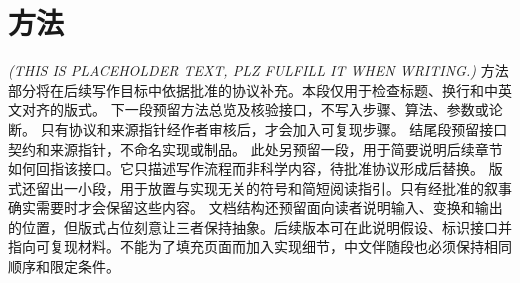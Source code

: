 \section{方法}\label{sec:approach}
\textit{(THIS IS PLACEHOLDER TEXT, PLZ FULFILL IT WHEN WRITING.)}
方法部分将在后续写作目标中依据批准的协议补充。本段仅用于检查标题、换行和中英文对齐的版式。
下一段预留方法总览及核验接口，不写入步骤、算法、参数或论断。
只有协议和来源指针经作者审核后，才会加入可复现步骤。
结尾段预留接口契约和来源指针，不命名实现或制品。
此处另预留一段，用于简要说明后续章节如何回指该接口。它只描述写作流程而非科学内容，待批准协议形成后替换。
版式还留出一小段，用于放置与实现无关的符号和简短阅读指引。只有经批准的叙事确实需要时才会保留这些内容。
文档结构还预留面向读者说明输入、变换和输出的位置，但版式占位刻意让三者保持抽象。后续版本可在此说明假设、标识接口并指向可复现材料。不能为了填充页面而加入实现细节，中文伴随段也必须保持相同顺序和限定条件。
